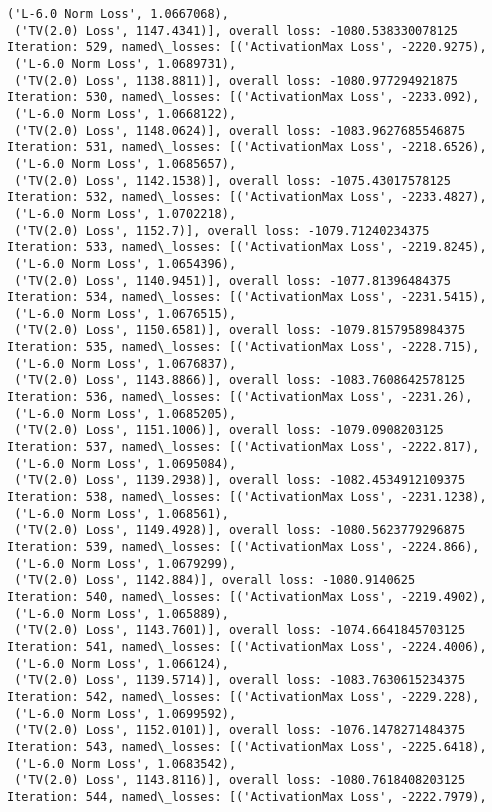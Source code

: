 \documentclass[10pt]{article}
\begin{document}
\begin{Verbatim}[commandchars=\\\{\}]
 ('L-6.0 Norm Loss', 1.0667068),
 ('TV(2.0) Loss', 1147.4341)], overall loss: -1080.538330078125
Iteration: 529, named\_losses: [('ActivationMax Loss', -2220.9275),
 ('L-6.0 Norm Loss', 1.0689731),
 ('TV(2.0) Loss', 1138.8811)], overall loss: -1080.977294921875
Iteration: 530, named\_losses: [('ActivationMax Loss', -2233.092),
 ('L-6.0 Norm Loss', 1.0668122),
 ('TV(2.0) Loss', 1148.0624)], overall loss: -1083.9627685546875
Iteration: 531, named\_losses: [('ActivationMax Loss', -2218.6526),
 ('L-6.0 Norm Loss', 1.0685657),
 ('TV(2.0) Loss', 1142.1538)], overall loss: -1075.43017578125
Iteration: 532, named\_losses: [('ActivationMax Loss', -2233.4827),
 ('L-6.0 Norm Loss', 1.0702218),
 ('TV(2.0) Loss', 1152.7)], overall loss: -1079.71240234375
Iteration: 533, named\_losses: [('ActivationMax Loss', -2219.8245),
 ('L-6.0 Norm Loss', 1.0654396),
 ('TV(2.0) Loss', 1140.9451)], overall loss: -1077.81396484375
Iteration: 534, named\_losses: [('ActivationMax Loss', -2231.5415),
 ('L-6.0 Norm Loss', 1.0676515),
 ('TV(2.0) Loss', 1150.6581)], overall loss: -1079.8157958984375
Iteration: 535, named\_losses: [('ActivationMax Loss', -2228.715),
 ('L-6.0 Norm Loss', 1.0676837),
 ('TV(2.0) Loss', 1143.8866)], overall loss: -1083.7608642578125
Iteration: 536, named\_losses: [('ActivationMax Loss', -2231.26),
 ('L-6.0 Norm Loss', 1.0685205),
 ('TV(2.0) Loss', 1151.1006)], overall loss: -1079.0908203125
Iteration: 537, named\_losses: [('ActivationMax Loss', -2222.817),
 ('L-6.0 Norm Loss', 1.0695084),
 ('TV(2.0) Loss', 1139.2938)], overall loss: -1082.4534912109375
Iteration: 538, named\_losses: [('ActivationMax Loss', -2231.1238),
 ('L-6.0 Norm Loss', 1.068561),
 ('TV(2.0) Loss', 1149.4928)], overall loss: -1080.5623779296875
Iteration: 539, named\_losses: [('ActivationMax Loss', -2224.866),
 ('L-6.0 Norm Loss', 1.0679299),
 ('TV(2.0) Loss', 1142.884)], overall loss: -1080.9140625
Iteration: 540, named\_losses: [('ActivationMax Loss', -2219.4902),
 ('L-6.0 Norm Loss', 1.065889),
 ('TV(2.0) Loss', 1143.7601)], overall loss: -1074.6641845703125
Iteration: 541, named\_losses: [('ActivationMax Loss', -2224.4006),
 ('L-6.0 Norm Loss', 1.066124),
 ('TV(2.0) Loss', 1139.5714)], overall loss: -1083.7630615234375
Iteration: 542, named\_losses: [('ActivationMax Loss', -2229.228),
 ('L-6.0 Norm Loss', 1.0699592),
 ('TV(2.0) Loss', 1152.0101)], overall loss: -1076.1478271484375
Iteration: 543, named\_losses: [('ActivationMax Loss', -2225.6418),
 ('L-6.0 Norm Loss', 1.0683542),
 ('TV(2.0) Loss', 1143.8116)], overall loss: -1080.7618408203125
Iteration: 544, named\_losses: [('ActivationMax Loss', -2222.7979),

\end{Verbatim}
\end{document}
